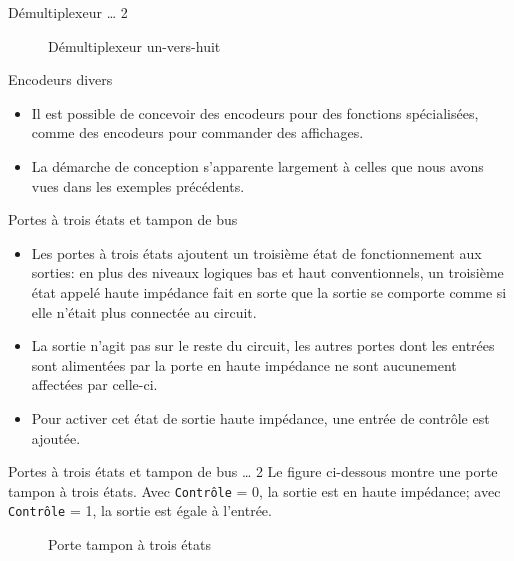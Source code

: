 \documentclass[presentation]{beamer}
\begin{document}
\begin{frame}[label={sec:org7e83382}]{Démultiplexeur \ldots{} 2}
\begin{figure}[htbp]
\centering

\caption{\label{fig:org34b8a0c}Démultiplexeur un-vers-huit}
\end{figure}
\end{frame}

\begin{frame}[label={sec:orgdfc4f38}]{Encodeurs divers}
\begin{itemize}
\item Il est possible de concevoir des encodeurs pour des fonctions spécialisées, comme des encodeurs pour commander des affichages.

\item La démarche de conception s'apparente largement à celles que nous avons vues dans les exemples précédents.
\end{itemize}
\end{frame}


\begin{frame}[label={sec:org0d3e65b}]{Portes à trois états et tampon de bus}
\begin{itemize}
\item Les portes à trois états ajoutent un troisième état de fonctionnement aux sorties: en plus des niveaux logiques bas et haut conventionnels, un troisième état appelé \alert{haute impédance} fait en sorte que la sortie se comporte comme si elle n'était plus connectée au circuit.

\item La sortie n'agit pas sur le reste du circuit, les autres portes dont les entrées sont alimentées par la porte en haute impédance ne sont aucunement affectées par celle-ci.

\item Pour activer cet état de sortie haute impédance, une entrée de contrôle est ajoutée.
\end{itemize}
\end{frame}

\begin{frame}[label={sec:org3570bbb},fragile]{Portes à trois états et tampon de bus \ldots{} 2}
 Le figure ci-dessous montre une porte tampon à trois états. Avec
\texttt{Contrôle} = 0, la sortie est en haute impédance; avec  \texttt{Contrôle} = 1,
la sortie est égale à l'entrée.

\begin{figure}[htbp]
\centering

\caption{\label{fig:org237d1d5}Porte tampon à trois états}
\end{figure}
\end{frame}
\end{document}
